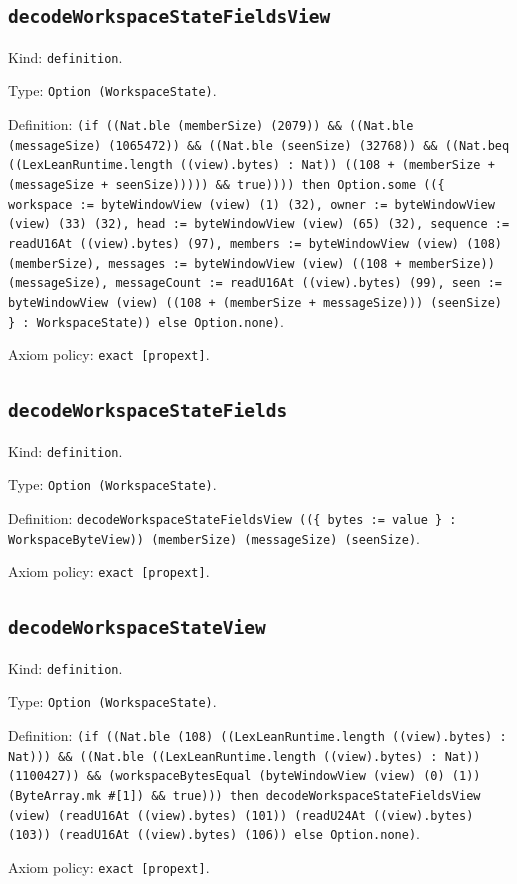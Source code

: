 \documentclass[11pt]{article}
\begin{document}
\subsection*{\texttt{decodeWorkspaceStateFieldsView}}
\noindent Kind: \texttt{definition}.\par
\noindent Type: \texttt{Option (WorkspaceState)}.\par
\noindent Definition: \texttt{(if ((Nat.ble (memberSize) (2079)) \&\& ((Nat.ble (messageSize) (1065472)) \&\& ((Nat.ble (seenSize) (32768)) \&\& ((Nat.beq ((LexLeanRuntime.length ((view).bytes) : Nat)) ((108 + (memberSize + (messageSize + seenSize))))) \&\& true)))) then Option.some ((\{ workspace := byteWindowView (view) (1) (32), owner := byteWindowView (view) (33) (32), head := byteWindowView (view) (65) (32), sequence := readU16At ((view).bytes) (97), members := byteWindowView (view) (108) (memberSize), messages := byteWindowView (view) ((108 + memberSize)) (messageSize), messageCount := readU16At ((view).bytes) (99), seen := byteWindowView (view) ((108 + (memberSize + messageSize))) (seenSize) \} : WorkspaceState)) else Option.none)}.\par
\noindent Axiom policy: \texttt{exact [propext]}.\par
\subsection*{\texttt{decodeWorkspaceStateFields}}
\noindent Kind: \texttt{definition}.\par
\noindent Type: \texttt{Option (WorkspaceState)}.\par
\noindent Definition: \texttt{decodeWorkspaceStateFieldsView ((\{ bytes := value \} : WorkspaceByteView)) (memberSize) (messageSize) (seenSize)}.\par
\noindent Axiom policy: \texttt{exact [propext]}.\par
\subsection*{\texttt{decodeWorkspaceStateView}}
\noindent Kind: \texttt{definition}.\par
\noindent Type: \texttt{Option (WorkspaceState)}.\par
\noindent Definition: \texttt{(if ((Nat.ble (108) ((LexLeanRuntime.length ((view).bytes) : Nat))) \&\& ((Nat.ble ((LexLeanRuntime.length ((view).bytes) : Nat)) (1100427)) \&\& (workspaceBytesEqual (byteWindowView (view) (0) (1)) (ByteArray.mk \#[1]) \&\& true))) then decodeWorkspaceStateFieldsView (view) (readU16At ((view).bytes) (101)) (readU24At ((view).bytes) (103)) (readU16At ((view).bytes) (106)) else Option.none)}.\par
\noindent Axiom policy: \texttt{exact [propext]}.\par
\end{document}
